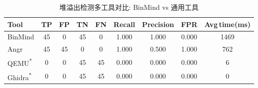 \begin{table}[ht]
\centering
\small
\begin{tabular}{lcccccccc}
\hline
Tool & TP & FP & TN & FN & Recall & Precision & FPR & Avg\,time(ms) \\
\hline
BinMind & 45 & 0 & 45 & 0 & 1.000 & 1.000 & 0.000 & 1469 \\
Angr & 45 & 45 & 0 & 0 & 1.000 & 0.500 & 1.000 & 762 \\
QEMU\textsuperscript{*}  & 0 & 0 & 45 & 45 & 0.000 & 0.000 & 0.000 & 6 \\
Ghidra\textsuperscript{*}  & 0 & 0 & 45 & 45 & 0.000 & 0.000 & 0.000 & 0 \\
\hline
\end{tabular}
\caption{堆溢出检测多工具对比: BinMind vs 通用工具}
\label{tab:heap-comparison}
\end{table}


